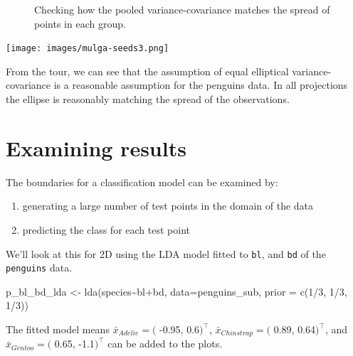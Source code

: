 \documentclass[
  letterpaper,
]{krantz}
\newenvironment{Shaded}{\begin{snugshade}}{\end{snugshade}}
\newcommand{\AttributeTok}[1]{\textcolor[rgb]{0.40,0.45,0.13}{#1}}
\newcommand{\DecValTok}[1]{\textcolor[rgb]{0.68,0.00,0.00}{#1}}
\newcommand{\FunctionTok}[1]{\textcolor[rgb]{0.28,0.35,0.67}{#1}}
\newcommand{\NormalTok}[1]{\textcolor[rgb]{0.00,0.23,0.31}{#1}}
\newcommand{\OtherTok}[1]{\textcolor[rgb]{0.00,0.23,0.31}{#1}}
\newcommand{\SpecialCharTok}[1]{\textcolor[rgb]{0.37,0.37,0.37}{#1}}
\providecommand{\tightlist}{%
  \setlength{\itemsep}{0pt}\setlength{\parskip}{0pt}}\usepackage{longtable,booktabs,array}
\newcommand{\insightbox}[1]{%
\noindent\colorbox{insight!30}{%
\begin{minipage}{0.98\textwidth}%
    \centering%
    \begin{minipage}[c]{0.15\textwidth} %
      \texttt{[image: images/mulga-seeds3.png]} %
    \end{minipage}%
    \hfill %
    \begin{minipage}[c]{0.8\textwidth} %
      \bigskip%
      \textsf{#1}%
      \bigskip%
    \end{minipage}%
    \hspace*{3mm}%
  \end{minipage}%
}%
}
\begin{document}
\begin{figure}
\begin{minipage}{0.50\linewidth}
{}


\end{minipage}%

\caption{\label{fig-penguins-lda-pooled-pdf}Checking how the pooled
variance-covariance matches the spread of points in each group.}

\end{figure}%

\insightbox{From the tour, we can see that the assumption of equal elliptical variance-covariance is a reasonable assumption for the penguins data. In all projections the ellipse is reasonably matching the spread of the observations.
}

\section{Examining results}\label{examining-results}

The boundaries for a classification model can be examined by:

\begin{enumerate}
\def\labelenumi{\arabic{enumi}.}
\tightlist
\item
  generating a large number of test points in the domain of the data
\item
  predicting the class for each test point
\end{enumerate}

We'll look at this for 2D using the LDA model fitted to \texttt{bl}, and
\texttt{bd} of the \texttt{penguins} data.

\begin{Shaded}
\begin{Highlighting}[]
\NormalTok{p\_bl\_bd\_lda }\OtherTok{\textless{}{-}} \FunctionTok{lda}\NormalTok{(species}\SpecialCharTok{\textasciitilde{}}\NormalTok{bl}\SpecialCharTok{+}\NormalTok{bd, }\AttributeTok{data=}\NormalTok{penguins\_sub, }
                                  \AttributeTok{prior =} \FunctionTok{c}\NormalTok{(}\DecValTok{1}\SpecialCharTok{/}\DecValTok{3}\NormalTok{, }\DecValTok{1}\SpecialCharTok{/}\DecValTok{3}\NormalTok{, }\DecValTok{1}\SpecialCharTok{/}\DecValTok{3}\NormalTok{))}
\end{Highlighting}
\end{Shaded}

The fitted model means \(\bar{x}_{Adelie} = (\) -0.95, 0.6\()^\top\),
\(\bar{x}_{Chinstrap} = (\) 0.89, 0.64\()^\top\), and
\(\bar{x}_{Gentoo} = (\) 0.65, -1.1\()^\top\) can be added to the plots.
\end{document}
